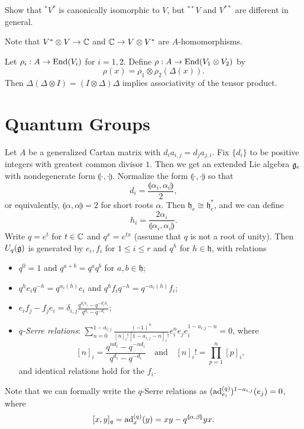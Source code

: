 \begin{exercise}
  Show that ${}^*V^*$ is canonically
  isomorphic to $V$, but ${}^{**}V$ and
  $V^{**}$ are different in general.
\end{exercise}

\begin{remark}
  Note that $V^* \otimes V \to \mathbb{C}$ and
  $\mathbb{C} \to V \otimes V^*$ are $A$-homomorphisms.
\end{remark}

\begin{remark}
  Let $\rho_i : A \to \operatorname{End}(V_i)$ for
  $i = 1, 2$. Define
  $\rho : A \to \operatorname{End}(V_1 \otimes V_2)$ by
  \[
    \rho(x) = \rho_1 \otimes \rho_2(\Delta(x)).
  \]
  Then $\Delta(\Delta \otimes I) = (I \otimes \Delta) \Delta$
  implies associativity of the tensor product.
\end{remark}

\section{Quantum Groups}
\begin{remark}
  Let $A$ be a generalized Cartan matrix
  with $d_i a_{i, j} = d_j a_{j, i}$. Fix
  $\{d_i\}$ to be positive integers
  with greatest common divisor $1$. Then
  we get an extended Lie algebra
  $\mathfrak{g}_e$ with nondegenerate form
  $\llparenthesis \cdot, \cdot \rrparenthesis$.
  Normalize the form $\llparenthesis \cdot, \cdot \rrparenthesis$
  so that
  \[
    d_i = \frac{\llparenthesis \alpha_i, \alpha_i \rrparenthesis}{2},
  \]
  or equivalently, $\llparenthesis \alpha, \alpha \rrparenthesis = 2$ for short
  roots $\alpha$. Then
  $\mathfrak{h}_e \cong \mathfrak{h}^*_e$, and
  we can define
  \[
    h_i = \frac{2 \alpha_i}{\llparenthesis \alpha_i, \alpha_i \rrparenthesis}.
  \]
  Write $q = e^t$ for $t \in \mathbb{C}$ and
  $q^x = e^{tx}$ (assume that $q$ is not
  a root of unity). Then $U_q(\mathfrak{g})$ is generated
  by $e_i, f_i$ for $1 \le i \le r$ and
  $q^h$ for $h \in \mathfrak{h}$, with relations
  \begin{itemize}
    \item $q^0 = 1$ and
      $q^{a + b} = q^a q^b$
      for $a, b \in \mathfrak{h}$;
    \item $q^h e_i q^{-h} = q^{\alpha_i(h)} e_i$
      and
      $q^h f_i q^{-h} = q^{-\alpha_i(h)} f_i$;
    \item $\displaystyle e_i f_j - f_j e_i = \delta_{i, j} \frac{q^{d_i h_i} - q^{-d_i h_i}}{q^{d_i} - q^{-d_i}}$;
    \item \emph{$q$-Serre relations}:
      $\displaystyle \sum_{n = 0}^{1 - a_{i, j}} \frac{(-1)^n}{[n]_i! [1 - a_{i, j} - n]_i!} e_i^n e_j e_i^{1 - a_{i, j} - n} = 0$,
      where
      \[
        [n]_i
        = \frac{q^{nd_i} - q^{-nd_i}}{q^{d_i} - q^{-d_i}}
        \quad \text{and} \quad
        [n]_i! = \prod_{p = 1}^n [p]_i,
      \]
      and identical relations hold for the $f_i$.
  \end{itemize}
  Note that we can formally write the
  $q$-Serre relations as
  $(\operatorname{ad}^{(q)}_{e_i})^{1 - a_{i, j}}(e_j) = 0$,
  where
  \[
    [x, y]_q
    = \operatorname{ad}_x^{(q)}(y)
    = xy - q^{\llparenthesis \alpha, \beta \rrparenthesis} yx.
  \]
\end{remark}
